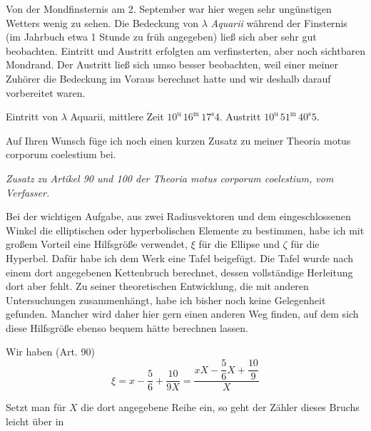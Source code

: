 \par\indent Von der Mondfinsternis am 2. September war hier wegen sehr ungünstigen Wetters wenig zu sehen. Die Bedeckung von $\lambda$ \emph{Aquarii} während der Finsternis (im Jahrbuch etwa 1 Stunde zu früh angegeben) ließ sich aber sehr gut beobachten. Eintritt und Austritt erfolgten am verfinsterten, aber noch sichtbaren Mondrand. Der Austritt ließ sich umso besser beobachten, weil einer meiner Zuhörer die Bedeckung im Voraus berechnet hatte und wir deshalb darauf vorbereitet waren.

\par\indent Eintritt von $\lambda$ Aquarii, mittlere Zeit $10^{\mathrm u}\,16^{\mathrm m}\,17^{\mathrm s}4$. Austritt $10^{\mathrm u}\,51^{\mathrm m}\,40^{\mathrm s}5$.

\par\indent Auf Ihren Wunsch füge ich noch einen kurzen Zusatz zu meiner Theoria motus corporum coelestium bei.
\begin{center}\emph{Zusatz zu Artikel 90 und 100 der Theoria motus corporum coelestium, vom Verfasser.}\end{center}
\par\indent Bei der wichtigen Aufgabe, aus zwei Radiusvektoren und dem eingeschlossenen Winkel die elliptischen oder hyperbolischen Elemente zu bestimmen, habe ich mit großem Vorteil eine Hilfsgröße verwendet, $\xi$ für die Ellipse und $\zeta$ für die Hyperbel. Dafür habe ich dem Werk eine Tafel beigefügt. Die Tafel wurde nach einem dort angegebenen Kettenbruch berechnet, dessen vollständige Herleitung dort aber fehlt. Zu seiner theoretischen Entwicklung, die mit anderen Untersuchungen zusammenhängt, habe ich bisher noch keine Gelegenheit gefunden. Mancher wird daher hier gern einen anderen Weg finden, auf dem sich diese Hilfsgröße ebenso bequem hätte berechnen lassen.

\par\indent Wir haben (Art. 90)
\[
\xi=x-\frac{5}{6}+\frac{10}{9X}=\frac{xX-\dfrac{5}{6}X+\dfrac{10}{9}}{X}
\]
\par\indent Setzt man für $X$ die dort angegebene Reihe ein, so geht der Zähler dieses Bruchs leicht über in

